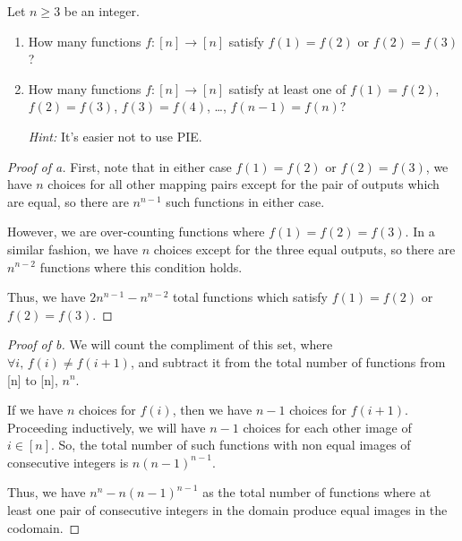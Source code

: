\documentclass{subfiles}
\begin{document}
\begin{problem}
Let $n \ge 3$ be an integer.
\begin{enumerate}
	\item How many functions $f : [n] \to [n]$ satisfy $f(1) = f(2)$ or $f(2) = f(3)$?
	\item How many functions $f : [n] \to [n]$ satisfy at least one of $f(1) = f(2)$, $f(2) = f(3)$, $f(3) = f(4)$, \dots, $f(n-1) = f(n)$?

	      \emph{Hint:} It's easier not to use PIE.
\end{enumerate}
\end{problem}
\begin{proof}[Proof of a]
	First, note that in either case $f(1)=f(2)$ or  $f(2)=f(3)$, we have $n$ choices for all other mapping pairs except for the pair of outputs which are equal, so there are $n^{n-1}$ such functions in either case.

	However, we are over-counting functions where $f(1)=f(2)=f(3)$.
	In a similar fashion, we have  $n$ choices except for the three equal outputs, so there are  $n^{n-2}$ functions where this condition holds.

	Thus, we have $2n^{n-1}-n^{n-2}$ total functions which satisfy $f(1)=f(2)$ or  $f(2)=f(3)$.
\end{proof}
\begin{proof}[Proof of b]
	We will count the compliment of this set, where $\forall i,\, f(i)\neq f(i + 1)$, and subtract it from the total number of functions from  [n] to [n],  $n^{n}$.

	If we have $n$ choices for  $f(i)$, then we have  $n-1$ choices for  $f(i+1)$.
	Proceeding inductively, we will have $n-1$ choices for each other image of  $i\in [n]$.
	So, the total number of such functions with non equal images of consecutive integers is $n(n-1)^{n-1}$.

	Thus, we have $n^n-n(n-1)^{n-1}$ as the total number of functions where at least one pair of consecutive integers in the domain produce equal images in the codomain.
\end{proof}
\end{document}
